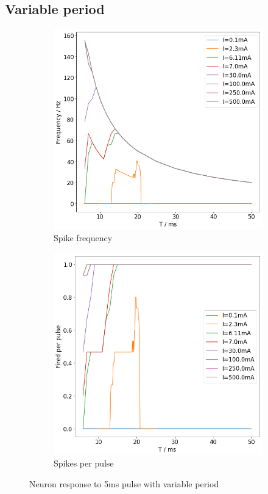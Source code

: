 \documentclass[twoside,twocolumn]{article}
\begin{document}
\twocolumn
\subsection{ Variable period}
\begin{figure}[h]
  \centering
  \begin{subfigure}[t]{0.5\textwidth}
    \includegraphics[width=\linewidth]{2aa}
  \caption{Spike frequency}
  \label{sub:2af}
  \end{subfigure}
  \begin{subfigure}[t]{0.5\textwidth}
    \includegraphics[width=\linewidth]{2ab}
  \caption{Spikes per pulse}
  \label{sub:2ap}
  \end{subfigure}
  \caption{Neuron response to 5ms pulse with variable period}
  \label{fig:2b}
\end{figure}
\end{document}
